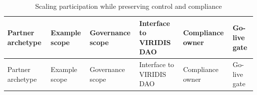 \documentclass[
  english,
  12pt,
  oneside,
  open=any]{scrbook}
\begin{document}
\begin{longtable}[]{@{}
  >{\raggedright\arraybackslash}p{}
  >{\raggedright\arraybackslash}p{}
  >{\raggedright\arraybackslash}p{}
  >{\raggedright\arraybackslash}p{}
  >{\raggedright\arraybackslash}p{}
  >{\raggedright\arraybackslash}p{}@{}}
\caption{Scaling participation while preserving control and
compliance}\label{tbl-scaling}\tabularnewline
\toprule\noalign{}
\begin{minipage}[b]{\linewidth}\raggedright
Partner archetype
\end{minipage} & \begin{minipage}[b]{\linewidth}\raggedright
Example scope
\end{minipage} & \begin{minipage}[b]{\linewidth}\raggedright
Governance scope
\end{minipage} & \begin{minipage}[b]{\linewidth}\raggedright
Interface to VIRIDIS DAO
\end{minipage} & \begin{minipage}[b]{\linewidth}\raggedright
Compliance owner
\end{minipage} & \begin{minipage}[b]{\linewidth}\raggedright
Go-live gate
\end{minipage} \\
\midrule\noalign{}
\endfirsthead
\toprule\noalign{}
\begin{minipage}[b]{\linewidth}\raggedright
Partner archetype
\end{minipage} & \begin{minipage}[b]{\linewidth}\raggedright
Example scope
\end{minipage} & \begin{minipage}[b]{\linewidth}\raggedright
Governance scope
\end{minipage} & \begin{minipage}[b]{\linewidth}\raggedright
Interface to VIRIDIS DAO
\end{minipage} & \begin{minipage}[b]{\linewidth}\raggedright
Compliance owner
\end{minipage} & \begin{minipage}[b]{\linewidth}\raggedright
Go-live gate

\end{minipage}
\end{longtable}
\end{document}
